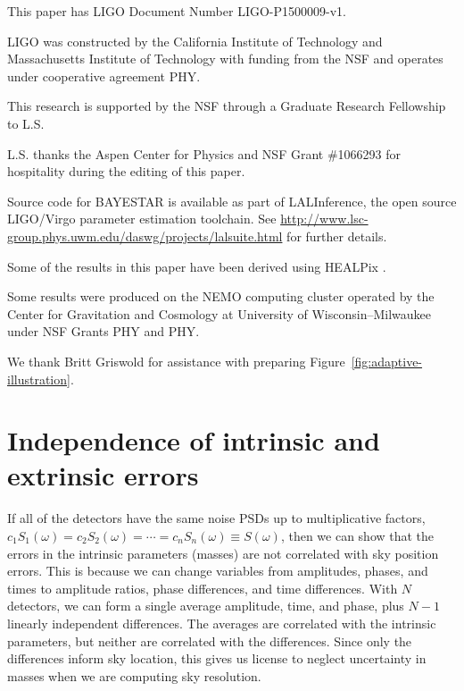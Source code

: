 \documentclass[amsmath,amssymb,aps,prx,reprint,nopreprintnumbers,nofootinbib]{revtex4-1}
\begin{document}


\begin{acknowledgements}
This paper has LIGO Document Number LIGO\nobreakdashes-P1500009\nobreakdashes-v1.

LIGO was constructed by the California Institute of Technology and Massachusetts Institute of Technology with funding from the \ac{NSF} and operates under cooperative agreement PHY.

This research is supported by the \ac{NSF} through a Graduate Research Fellowship to L.S.

L.S. thanks the Aspen Center for Physics and \ac{NSF} Grant \#1066293 for hospitality during the editing of this paper.

Source code for \ac{BAYESTAR} is available as part of LALInference, the open source LIGO/Virgo parameter estimation toolchain. See \url{http://www.lsc-group.phys.uwm.edu/daswg/projects/lalsuite.html} for further details.

Some of the results in this paper have been derived using \ac{HEALPix} \cite{healpix}.

Some results were produced on the NEMO computing cluster operated by the Center for Gravitation and Cosmology at University of Wisconsin\nobreakdashes--Milwaukee under \ac{NSF} Grants PHY and PHY.

We thank Britt Griswold for assistance with preparing Figure~\ref{fig:adaptive-illustration}.
\end{acknowledgements}

\appendix

\section{Independence of intrinsic and extrinsic errors}
\label{sec:independence-intrinsic-extrinsic}

If all of the detectors have the same noise \acp{PSD} up to multiplicative factors, $c_1 S_1(\omega) = c_2 S_2(\omega) = \cdots = c_n S_n(\omega) \equiv S(\omega)$, then we can show that the errors in the intrinsic parameters (masses) are not correlated with sky position errors. This is because we can change variables from amplitudes, phases, and times to amplitude ratios, phase differences, and time differences. With $N$ detectors, we can form a single average amplitude, time, and phase, plus $N-1$ linearly independent differences. The averages are correlated with the intrinsic parameters, but neither are correlated with the differences. Since only the differences inform sky location, this gives us license to neglect uncertainty in masses when we are computing sky resolution.
\end{document}
